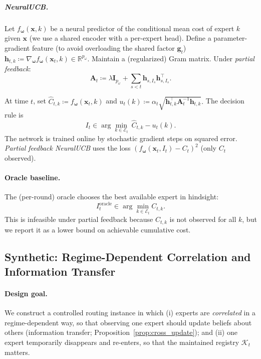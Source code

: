 \subparagraph{NeuralUCB.}
Let \(f_{\boldsymbol{\omega}}(\mathbf{x},k)\) be a neural predictor of the conditional mean cost of expert
\(k\) given \(\mathbf{x}\) (we use a shared encoder with a per-expert head).
Define a parameter-gradient feature (to avoid overloading the shared factor \(\mathbf{g}_t\))
\(
\mathbf{h}_{t,k}\coloneqq \nabla_{\boldsymbol{\omega}} f_{\boldsymbol{\omega}}(\mathbf{x}_t,k)\in\mathbb{R}^{p_\omega}.
\)
Maintain a (regularized) Gram matrix. Under \emph{partial feedback}:
\[
\mathbf{A}_t\coloneqq \lambda \mathbf{I}_{p_\omega}
+
\sum_{s<t} \mathbf{h}_{s,I_s}\mathbf{h}_{s,I_s}^\top.
\]

At time \(t\), set
\(
\widehat{C}_{t,k}\coloneqq f_{\boldsymbol{\omega}}(\mathbf{x}_t,k)
\)
and
\(
u_t(k)\coloneqq \alpha_t\sqrt{\mathbf{h}_{t,k}^\top \mathbf{A}_t^{-1}\mathbf{h}_{t,k}}.
\)
The decision rule is
\[
I_t \in \arg\min_{k\in\mathcal{E}_t}\ \widehat{C}_{t,k}-u_t(k).
\]
The network is trained online by stochastic gradient steps on squared error.
\emph{Partial feedback NeuralUCB} uses the loss \((f_{\boldsymbol{\omega}}(\mathbf{x}_t,I_t)-C_t)^2\) (only \(C_t\) observed).

\paragraph{Oracle baseline.}
The (per-round) oracle chooses the best available expert in hindsight:
\[
I_t^{\mathrm{oracle}} \in \arg\min_{k\in\mathcal{E}_t} C_{t,k}.
\]
This is infeasible under partial feedback because \(C_{t,k}\) is not observed for all \(k\), but we
report it as a lower bound on achievable cumulative cost.


\subsection{Synthetic: Regime-Dependent Correlation and Information Transfer}
\label{sec:exp_synthetic_transfer_appendix}

\paragraph{Design goal.}
We construct a controlled routing instance in which (i) experts are \emph{correlated} in a
regime-dependent way, so that observing one expert should update beliefs about others (information
transfer; Proposition~\ref{prop:cross_update}); and (ii) one expert temporarily disappears and
re-enters, so that the maintained registry \(\mathcal{K}_t\) matters.

